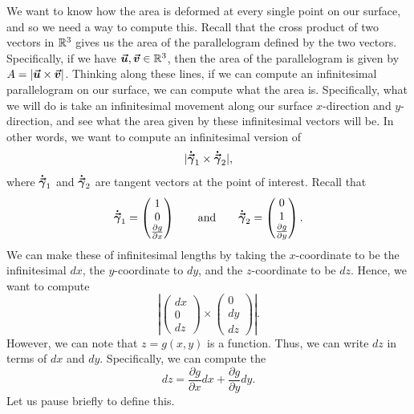                                       We want to know how the area is deformed at every single point on our surface, and so we need a way to compute this.  Recall that the cross product of two vectors in $\mathbb{R}^3$ gives us the area of the parallelogram defined by the two vectors.  Specifically, if we have $\boldsymbol{\boldsymbol{\vec{u}}},\boldsymbol{\boldsymbol{\vec{v}}} \in \mathbb{R}^3$, then the area of the parallelogram is given by $A=|\boldsymbol{\boldsymbol{\vec{u}}}\times \boldsymbol{\boldsymbol{\vec{v}}}|$.  Thinking along these lines, if we can compute an infinitesimal parallelogram on our surface, we can compute what the area is.  Specifically, what we will do is take an infinitesimal movement along our surface $x$-direction and $y$-direction, and see what the area given by these infinitesimal vectors will be.  In other words, we want to compute an infinitesimal version of
                                      \[
                                      |\boldsymbol{\dot{\vec{\gamma}}}_1 \times \boldsymbol{\dot{\vec{\gamma}}}_2|,
                                      \]
                                      where $\boldsymbol{\dot{\vec{\gamma}}}_1$ and $\boldsymbol{\dot{\vec{\gamma}}}_2$ are tangent vectors at the point of interest.  Recall that
                                      \[
                                      \boldsymbol{\dot{\vec{\gamma}}}_1 = \begin{pmatrix} 1 \\ 0 \\ \frac{\partial g}{\partial x} \end{pmatrix}  \qquad \textrm{and} \qquad  \boldsymbol{\dot{\vec{\gamma}}}_2 = \begin{pmatrix} 0 \\ 1 \\ \frac{\partial g}{\partial y} \end{pmatrix}.
                                      \]
                                      We can make these of infinitesimal lengths by taking the $x$-coordinate to be the infinitesimal $dx$, the $y$-coordinate to $dy$, and the $z$-coordinate to be $dz$.  Hence, we want to compute
                                      \[
                                      \left| \begin{pmatrix} dx \\ 0 \\ dz \end{pmatrix} \times \begin{pmatrix} 0 \\ dy \\ dz \end{pmatrix} \right|.
                                      \]
                                      However, we can note that $z=g(x,y)$ is a function. Thus, we can write $dz$ in terms of $dx$ and $dy$.  Specifically, we can compute the 
                                      \[
                                      dz = \frac{\partial g}{\partial x}dx + \frac{\partial g}{\partial y}dy.
                                      \]
                                      Let us pause briefly to define this.

